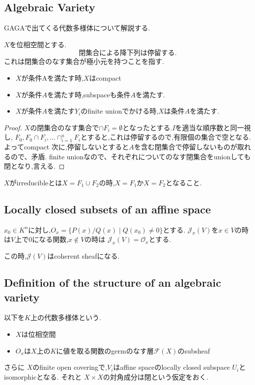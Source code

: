 \subsection{Algebraic Variety}
GAGAで出てくる代数多様体について解説する.

$X$を位相空間とする.
\begin{equation}
\mbox{閉集合による降下列は停留する.} \tag{A}
\end{equation}
これは閉集合のなす集合が極小元を持つことを指す.


\begin{prop}
  \begin{itemize}
    \item $X$が条件Aを満たす時,$X$はcompact
    \item $X$が条件$A$を満たす時,subspaceも条件$A$を満たす.
    \item $X$が条件$A$を満たす$Y_i$のfinite unionでかける時,$X$は条件$A$を満たす.
  \end{itemize}
\end{prop}
\begin{proof}
  $X$の閉集合のなす集合で$\cap F_i = \emptyset$となったとする.$I$を適当な順序数と同一視し,
  $F_0, F_0 \cap F_i, \ldots \cap_{i=1}^n F_i$とすると,これは停留するので,有限個の集合で空となる.よってcompact
次に,停留しないとすると$A$を含む閉集合で停留しないものが取れるので、矛盾.
finite unionなので、それぞれについてのなす閉集合をunionしても閉となり,言える.
\end{proof}

$X$がirreducibleとは$X = F_1 \cup F_2$の時,$X = F_1$か$X=F_2$となること.

\subsection{Locally closed subsets of an affine space}

$x_0 \in K^n$に対し,$O_x= \{P(x)/Q(x) \mid Q(x_0) \neq 0\}$とする.
$\mathscr{J}_{x}(V)$を$x \in V$の時は$V$上で0になる関数,$x \notin V$の時は
$\mathscr{J}_{x}(V)=\mathscr{O}_{x}$とする.

この時,$\mathcal{J}(V)$はcoherent sheafになる.

\subsection{Definition of the structure of an algebraic variety}

以下を$K$上の代数多様体という.
\begin{itemize}
    \item $X$は位相空間
    \item $O_x$は$X$上の$K$に値を取る関数のgermのなす層$\mathcal{F}(X)$のsubsheaf
\end{itemize}
さらに
$X$のfinite open coveringで,$V_i$はaffine spaceのlocally closed subspace $U_i$とisomorphicとなる.
それと
$X \times X$の対角成分は閉という仮定をおく.

